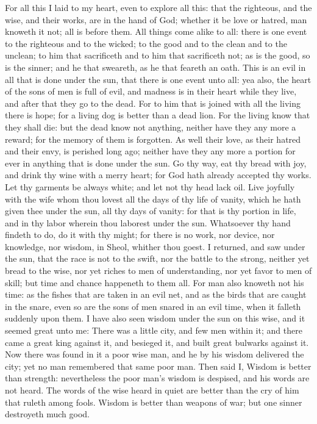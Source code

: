 For all this I laid to my heart, even to explore all this: that the righteous, and the wise, and their works, are in the hand of God; whether it be love or hatred, man knoweth it not; all is before them.  All things come alike to all: there is one event to the righteous and to the wicked; to the good and to the clean and to the unclean; to him that sacrificeth and to him that sacrificeth not; as is the good, so is the sinner; and he that sweareth, as he that feareth an oath. This is an evil in all that is done under the sun, that there is one event unto all: yea also, the heart of the sons of men is full of evil, and madness is in their heart while they live, and after that they go to the dead. For to him that is joined with all the living there is hope; for a living dog is better than a dead lion. For the living know that they shall die: but the dead know not anything, neither have they any more a reward; for the memory of them is forgotten. As well their love, as their hatred and their envy, is perished long ago; neither have they any more a portion for ever in anything that is done under the sun.  Go thy way, eat thy bread with joy, and drink thy wine with a merry heart; for God hath already accepted thy works. Let thy garments be always white; and let not thy head lack oil. Live joyfully with the wife whom thou lovest all the days of thy life of vanity, which he hath given thee under the sun, all thy days of vanity: for that is thy portion in life, and in thy labor wherein thou laborest under the sun. Whatsoever thy hand findeth to do, do it with thy might; for there is no work, nor device, nor knowledge, nor wisdom, in Sheol, whither thou goest.  I returned, and saw under the sun, that the race is not to the swift, nor the battle to the strong, neither yet bread to the wise, nor yet riches to men of understanding, nor yet favor to men of skill; but time and chance happeneth to them all. For man also knoweth not his time: as the fishes that are taken in an evil net, and as the birds that are caught in the snare, even so are the sons of men snared in an evil time, when it falleth suddenly upon them.  I have also seen wisdom under the sun on this wise, and it seemed great unto me: There was a little city, and few men within it; and there came a great king against it, and besieged it, and built great bulwarks against it. Now there was found in it a poor wise man, and he by his wisdom delivered the city; yet no man remembered that same poor man. Then said I, Wisdom is better than strength: nevertheless the poor man’s wisdom is despised, and his words are not heard. The words of the wise heard in quiet are better than the cry of him that ruleth among fools. Wisdom is better than weapons of war; but one sinner destroyeth much good. 

